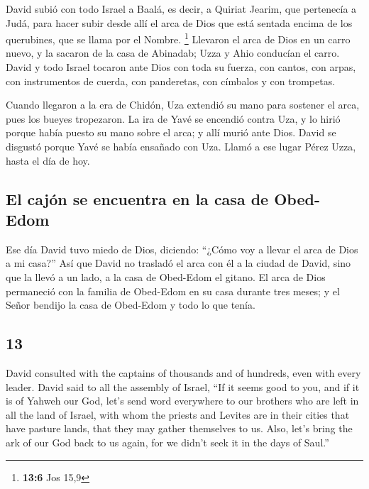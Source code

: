 \begin{paracol}{2}
 David subió con todo Israel a Baalá, es decir, a Quiriat
Jearim, que pertenecía a Judá, para hacer subir desde allí el arca de
Dios que está sentada encima de los querubines, que se llama por el
Nombre. \footnote{\textbf{13:6} Jos 15,9}  Llevaron el
arca de Dios en un carro nuevo, y la sacaron de la casa de Abinadab;
Uzza y Ahio conducían el carro.  David y todo Israel
tocaron ante Dios con toda su fuerza, con cantos, con arpas, con
instrumentos de cuerda, con panderetas, con címbalos y con trompetas.

 Cuando llegaron a la era de Chidón, Uza extendió su mano
para sostener el arca, pues los bueyes tropezaron.  La
ira de Yavé se encendió contra Uza, y lo hirió porque había puesto su
mano sobre el arca; y allí murió ante Dios.  David se
disgustó porque Yavé se había ensañado con Uza. Llamó a ese lugar Pérez
Uzza, hasta el día de hoy.

\hypertarget{el-cajuxf3n-se-encuentra-en-la-casa-de-obed-edom}{%
\subsection{El cajón se encuentra en la casa de
Obed-Edom}\label{el-cajuxf3n-se-encuentra-en-la-casa-de-obed-edom}}

 Ese día David tuvo miedo de Dios, diciendo: ``¿Cómo voy
a llevar el arca de Dios a mi casa?''  Así que David no
trasladó el arca con él a la ciudad de David, sino que la llevó a un
lado, a la casa de Obed-Edom el gitano.  El arca de Dios
permaneció con la familia de Obed-Edom en su casa durante tres meses; y
el Señor bendijo la casa de Obed-Edom y todo lo que tenía.

\switchcolumn
\begin{otherlanguage}{english}

\hypertarget{section-25}{%
\section{13}\label{section-25}}

 David consulted with the captains of thousands and of
hundreds, even with every leader.  David said to all the
assembly of Israel, ``If it seems good to you, and if it is of Yahweh
our God, let's send word everywhere to our brothers who are left in all
the land of Israel, with whom the priests and Levites are in their
cities that have pasture lands, that they may gather themselves to us.
 Also, let's bring the ark of our God back to us again,
for we didn't seek it in the days of Saul.''


\end{otherlanguage}
\end{paracol}
